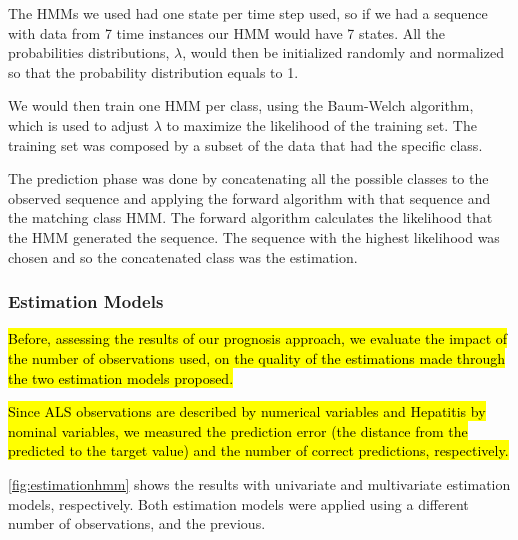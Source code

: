 The HMMs we used had one state per time step used, so if we had a sequence with data from 7 time instances our HMM 
would have 7 states. All the probabilities distributions, $\lambda$, would then be initialized randomly and normalized 
so that the probability distribution equals to 1.

We would then train one HMM per class, using the Baum-Welch algorithm, which is used to adjust $\lambda$ to maximize the 
likelihood of the training set. The training set was composed by a subset of the data that had the specific class. 

The prediction phase was done by concatenating all the possible classes to the observed sequence and applying the forward
 algorithm with that sequence and the matching class HMM. The forward algorithm calculates the likelihood that the HMM 
 generated the sequence. The sequence with the highest likelihood was chosen and so the concatenated class was the estimation.

\subsubsection{Estimation Models}
\label{subsubsection:estimation_hmm}

\hl{Before, assessing the results of our prognosis approach, we evaluate the impact of the number of observations used, on the 
quality of the estimations made through the two estimation models proposed.}

\hl{Since ALS observations are described by numerical variables and Hepatitis by nominal variables, we measured the prediction
 error (the distance from the predicted to the target value) and the number of correct predictions, respectively.}

\ref{fig:estimationhmm} shows the results with univariate and multivariate estimation models,
 respectively. Both estimation models were applied using a different number of observations, and the previous. 
 
